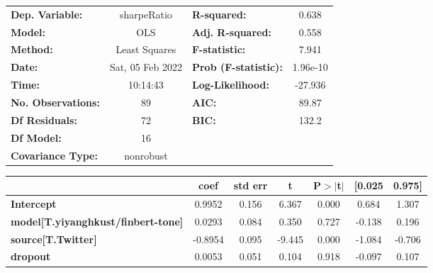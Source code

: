\begin{center}
\begin{tabular}{lclc}
\toprule
\textbf{Dep. Variable:}                    &   sharpeRatio    & \textbf{  R-squared:         } &     0.638   \\
\textbf{Model:}                            &       OLS        & \textbf{  Adj. R-squared:    } &     0.558   \\
\textbf{Method:}                           &  Least Squares   & \textbf{  F-statistic:       } &     7.941   \\
\textbf{Date:}                             & Sat, 05 Feb 2022 & \textbf{  Prob (F-statistic):} &  1.96e-10   \\
\textbf{Time:}                             &     10:14:43     & \textbf{  Log-Likelihood:    } &   -27.936   \\
\textbf{No. Observations:}                 &          89      & \textbf{  AIC:               } &     89.87   \\
\textbf{Df Residuals:}                     &          72      & \textbf{  BIC:               } &     132.2   \\
\textbf{Df Model:}                         &          16      & \textbf{                     } &             \\
\textbf{Covariance Type:}                  &    nonrobust     & \textbf{                     } &             \\
\bottomrule
\end{tabular}
\begin{tabular}{lcccccc}
                                           & \textbf{coef} & \textbf{std err} & \textbf{t} & \textbf{P$> |$t$|$} & \textbf{[0.025} & \textbf{0.975]}  \\
\midrule
\textbf{Intercept}                         &       0.9952  &        0.156     &     6.367  &         0.000        &        0.684    &        1.307     \\
\textbf{model[T.yiyanghkust/finbert-tone]} &       0.0293  &        0.084     &     0.350  &         0.727        &       -0.138    &        0.196     \\
\textbf{source[T.Twitter]}                 &      -0.8954  &        0.095     &    -9.445  &         0.000        &       -1.084    &       -0.706     \\
\textbf{dropout}                           &       0.0053  &        0.051     &     0.104  &         0.918        &       -0.097    &        0.107     \\

\end{tabular}
\end{center}
